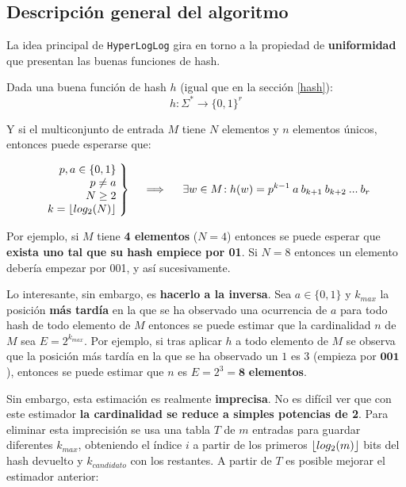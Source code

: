 \subsection{Descripción general del algoritmo}
\label{investigacion:descripcion}

La idea principal de \texttt{HyperLogLog} gira en torno a la propiedad de \textbf{uniformidad} que presentan las buenas
funciones de hash.

Dada una buena función de hash $h$ (igual que en la sección \ref{hash}):
$$h: \Sigma^* \rightarrow \{0,1\}^r$$

Y si el multiconjunto de entrada $M$ tiene $N$ elementos y $n$ elementos únicos, entonces puede esperarse que:

\begin{align*}
  \left.\begin{array}{r@{\mskip\thickmuskip}l}
    p, a \in \{0, 1\} \\
    p \neq a \\
    N \geq 2 \\
    k = \floor{log_2(N)}
  \end{array} \right\}
  \quad \implies \quad
  \left.
    \exists{w \in M}\!: h(w) = p^{k-1} \: a \: b_{k+1} \: b_{k+2} \: ... \: b_r
  \right.
\end{align*}

Por ejemplo, si $M$ tiene \textbf{4 elementos} ($N = 4$) entonces se puede esperar que \textbf{exista uno tal que su hash
empiece por 01}. Si $N = 8$ entonces un elemento debería empezar por 001, y así sucesivamente.

Lo interesante, sin embargo, es \textbf{hacerlo a la inversa}.
Sea $a \in \{0, 1\}$ y $k_{max}$ la posición \textbf{más tardía} en la que se ha observado
una ocurrencia de $a$ para todo hash de todo elemento de $M$ entonces se puede estimar que la cardinalidad $n$ de $M$ sea $E = 2^{k_{max}}$.
Por ejemplo, si tras aplicar $h$ a todo elemento de $M$ se observa que la posición más tardía en la que se ha observado un
$1$ es 3 (empieza por $\textbf{001}$), entonces se puede estimar que $n$ es $E = 2^3 = \textbf{8}$ \textbf{elementos}.

Sin embargo, esta estimación es realmente \textbf{imprecisa}. No es difícil ver que con este estimador
\textbf{la cardinalidad se reduce a simples potencias de 2}. Para eliminar esta imprecisión se usa una tabla $T$ de $m$ entradas
para guardar diferentes $k_{max}$, obteniendo el índice $i$ a partir de los primeros $\lfloor log_2(m)\rfloor$ bits del hash devuelto
y $k_{candidato}$ con los restantes. A partir de $T$ es posible mejorar el estimador anterior:

